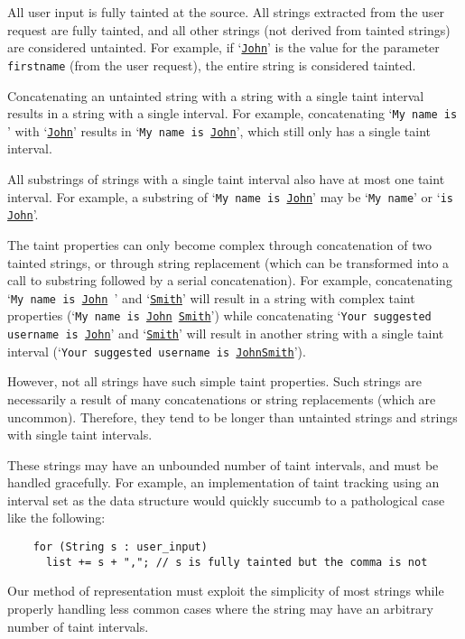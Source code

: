 \documentclass[times,11pt]{article}
\begin{document}
All user input is fully tainted at the source. All strings extracted from the user request are fully tainted, and all other strings (not derived from tainted strings) are considered untainted. For example, if `\texttt{\underline{John}}' is the value for the parameter \texttt{firstname} (from the user request), the entire string is considered tainted.

Concatenating an untainted string with a string with a single taint interval results in a string with a single interval. For example, concatenating `\texttt{My name is }' with `\texttt{\underline{John}}' results in `\texttt{My name is \underline{John}}', which still only has a single taint interval.

All substrings of strings with a single taint interval also have at most one taint interval. For example, a substring of `\texttt{My name is \underline{John}}' may be `\texttt{My name}' or `\texttt{is \underline{John}}'.

The taint properties can only become complex through concatenation of two tainted strings, or through string replacement (which can be transformed into a call to substring followed by a serial concatenation). For example, concatenating `\texttt{My name is \underline{John} }' and `\texttt{\underline{Smith}}' will result in a string with complex taint properties (`\texttt{My name is \underline{John} \underline{Smith}}') while concatenating `\texttt{Your suggested username is \underline{John}}' and `\texttt{\underline{Smith}}' will result in another string with a single taint interval (`\texttt{Your suggested username is \underline{JohnSmith}}').

However, not all strings have such simple taint properties. Such strings are necessarily a result of many concatenations or string replacements (which are uncommon). Therefore, they tend to be longer than untainted strings and strings with single taint intervals.

These strings may have an unbounded number of taint intervals, and must be handled gracefully. For example, an implementation of taint tracking using an interval set as the data structure would quickly succumb to a pathological case like the following:			
	\begin{verbatim}
	for (String s : user_input)
	  list += s + ","; // s is fully tainted but the comma is not
	\end{verbatim}

Our method of representation must exploit the simplicity of most strings while properly handling less common cases where the string may have an arbitrary number of taint intervals.
\end{document}
